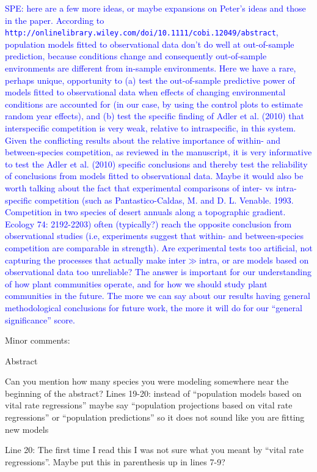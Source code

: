 \documentclass[12pt]{article}
\newcommand{\response}{\textcolor{blue}}
\begin{document}
{\response{SPE: here are a few more ideas, or maybe expansions on Peter's ideas and those in the paper. According to \texttt{http://onlinelibrary.wiley.com/doi/10.1111/cobi.12049/abstract}, 
population models fitted to observational data don't do well at out-of-sample prediction, because
conditions change and consequently out-of-sample environments are different from in-sample environments. Here we have a rare, perhaps unique, opportunity to (a) test the out-of-sample 
predictive power of models fitted to observational data when effects of changing environmental conditions are accounted for (in our case, by using the control plots to estimate random year effects), 
and (b) test the specific finding of Adler et al. (2010) that interspecific competition is very weak, relative to intraspecific, in this system. Given the conflicting results 
about the relative importance of within- and between-species competition, as reviewed in the manuscript, 
it is very informative to test the Adler et al. (2010) specific conclusions and thereby test the reliability of conclusions from models fitted to observational
data. Maybe it would also be worth talking about the fact that experimental comparisons of inter- vs intra-specific competition (such as Pantastico-Caldas, M. and D. L. Venable. 1993. 
Competition in two species of desert annuals along a topographic gradient. Ecology 74: 2192-2203) often (typically?) reach the opposite conclusion from observational studies (i.e, experiments
suggest that within- and between-species competition are comparable in strength). Are experimental tests too artificial, not capturing the processes that actually make inter$\gg$intra, or are 
models based on observational data too unreliable? The answer is important for our understanding of how plant communities operate, and for how we should study plant communities in the future.
The more we can say about our results having general methodological conclusions for future work, the more it will do for our ``general significance'' score.} 

Minor comments:

Abstract

Can you mention how many species you were modeling somewhere near the beginning of the abstract?
Lines 19-20: instead of “population models based on vital rate regressions” maybe say “population projections based on vital rate regressions” or “population predictions” so it does not sound like you are fitting new models

Line 20: The first time I read this I was not sure what you meant by “vital rate regressions”. Maybe put this in parenthesis up in lines 7-9?

}
\end{document}
